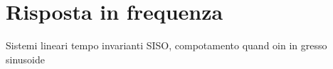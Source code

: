 \chapter{Risposta in frequenza}
Sistemi lineari tempo invarianti SISO, compotamento quand oin in gresso sinusoide